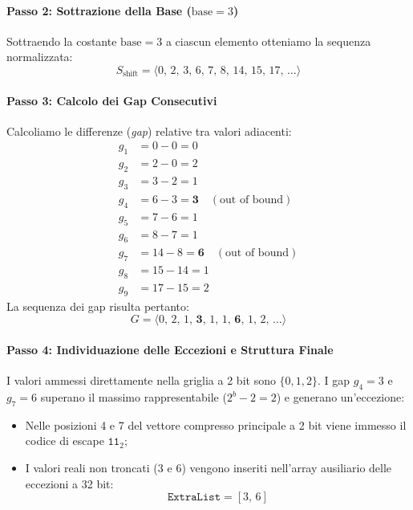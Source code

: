 \paragraph{Passo 2: Sottrazione della Base ($\text{base} = 3$)}
Sottraendo la costante $\text{base} = 3$ a ciascun elemento otteniamo la sequenza normalizzata:
\begin{equation}
  S_{\text{shift}} = \langle 0, \, 2, \, 3, \, 6, \, 7, \, 8, \, 14, \, 15, \, 17, \, \dots \rangle
\end{equation}

\paragraph{Passo 3: Calcolo dei Gap Consecutivi}
Calcoliamo le differenze (\textit{gap}) relative tra valori adiacenti:
\begin{align*}
  g_1 &= 0 - 0 = 0 \\
  g_2 &= 2 - 0 = 2 \\
  g_3 &= 3 - 2 = 1 \\
  g_4 &= 6 - 3 = \mathbf{3} \quad (\text{out of bound}) \\
  g_5 &= 7 - 6 = 1 \\
  g_6 &= 8 - 7 = 1 \\
  g_7 &= 14 - 8 = \mathbf{6} \quad (\text{out of bound}) \\
  g_8 &= 15 - 14 = 1 \\
  g_9 &= 17 - 15 = 2
\end{align*}
La sequenza dei gap risulta pertanto:
\begin{equation}
  G = \langle 0, \, 2, \, 1, \, \mathbf{3}, \, 1, \, 1, \, \mathbf{6}, \, 1, \, 2, \, \dots \rangle
\end{equation}

\paragraph{Passo 4: Individuazione delle Eccezioni e Struttura Finale}
I valori ammessi direttamente nella griglia a 2 bit sono $\{0, 1, 2\}$. I gap $g_4 = 3$ e $g_7 = 6$ superano il massimo rappresentabile ($2^b - 2 = 2$) e generano un'eccezione:
\begin{itemize}
  \item Nelle posizioni 4 e 7 del vettore compresso principale a 2 bit viene immesso il codice di escape $\texttt{11}_2$;
  \item I valori reali non troncati ($3$ e $6$) vengono inseriti nell'array ausiliario delle eccezioni a 32 bit:
  \begin{equation}
    \texttt{ExtraList} = [3, \, 6]
  \end{equation}
\end{itemize}

